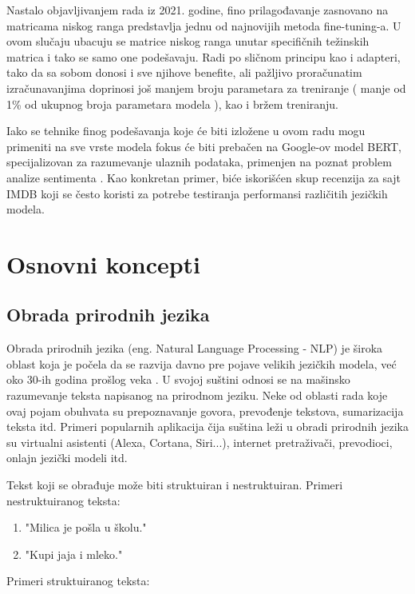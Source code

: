 \documentclass[12pt,oneside]{memoir}
\begin{document}
Nastalo objavljivanjem rada iz 2021. godine, fino prilagođavanje zasnovano na matricama niskog ranga predstavlja jednu od najnovijih metoda fine-tuning-a. U ovom slučaju ubacuju se matrice niskog ranga unutar specifičnih težinskih matrica i tako se samo one podešavaju. Radi po sličnom principu kao i adapteri, tako da sa sobom donosi i sve njihove benefite, ali pažljivo proračunatim izračunavanjima doprinosi još manjem broju parametara za treniranje ( manje od 1\% od ukupnog broja parametara modela ), kao i bržem treniranju.

Iako se tehnike finog podešavanja koje će biti izložene u ovom radu mogu primeniti na sve vrste modela fokus će biti prebačen na Google-ov model BERT, specijalizovan za razumevanje ulaznih podataka, primenjen na poznat problem analize sentimenta \cite{liu2012sentiment}. Kao konkretan primer, biće iskorišćen skup recenzija za sajt IMDB \cite{IMDBDataset} koji se često koristi za potrebe testiranja performansi različitih jezičkih modela.



\chapter{Osnovni koncepti}
\section{Obrada prirodnih jezika}

Obrada prirodnih jezika (eng. Natural Language Processing - NLP) je široka oblast koja je počela da se razvija davno pre pojave velikih jezičkih modela, već oko 30-ih godina prošlog veka \cite{HistoryOfNLP}. U svojoj suštini odnosi se na mašinsko razumevanje teksta napisanog na prirodnom jeziku. Neke od oblasti rada koje ovaj pojam obuhvata su prepoznavanje govora, prevođenje tekstova, sumarizacija teksta itd. Primeri popularnih aplikacija čija suština leži u obradi prirodnih jezika su virtualni asistenti (Alexa, Cortana, Siri...), internet pretraživači, prevodioci, onlajn jezički modeli itd.

Tekst koji se obrađuje može biti struktuiran i nestruktuiran. Primeri nestruktuiranog teksta:
 
\begin{enumerate}
	\item "Milica je pošla u školu."
	\item "Kupi jaja i mleko."
\end{enumerate}

Primeri struktuiranog teksta:
\end{document}
